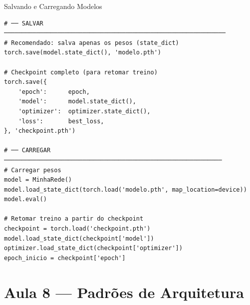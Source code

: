 \documentclass[aspectratio=169, 10pt]{beamer}
\begin{document}
\begin{frame}[fragile]{Salvando e Carregando Modelos}
\begin{lstlisting}
# ── SALVAR ──────────────────────────────────────────────────────────────
# Recomendado: salva apenas os pesos (state_dict)
torch.save(model.state_dict(), 'modelo.pth')

# Checkpoint completo (para retomar treino)
torch.save({
    'epoch':      epoch,
    'model':      model.state_dict(),
    'optimizer':  optimizer.state_dict(),
    'loss':       best_loss,
}, 'checkpoint.pth')

# ── CARREGAR ─────────────────────────────────────────────────────────────
# Carregar pesos
model = MinhaRede()
model.load_state_dict(torch.load('modelo.pth', map_location=device))
model.eval()

# Retomar treino a partir do checkpoint
checkpoint = torch.load('checkpoint.pth')
model.load_state_dict(checkpoint['model'])
optimizer.load_state_dict(checkpoint['optimizer'])
epoch_inicio = checkpoint['epoch']
\end{lstlisting}
\end{frame}

\section{Aula 8 — Padrões de Arquitetura}
\end{document}
